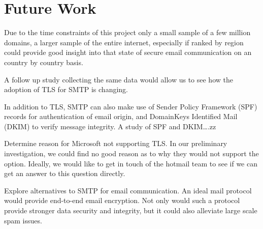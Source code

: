 \section{Future Work}
Due to the time constraints of this project only a small sample of a few million domains, a larger sample of the entire internet, especially if ranked by region could provide good insight into that state of secure email communication on an country by country basis.

A follow up study collecting the same data would allow us to see how the adoption of TLS for SMTP is changing.

In addition to TLS, SMTP can also make use of Sender Policy Framework (SPF) records for authentication of email origin, and DomainKeys Identified Mail (DKIM) to verify message integrity. A study of SPF and DKIM….zz

Determine reason for Microsoft not supporting TLS. In our preliminary investigation, we could find no good reason as to why they would not support the option. Ideally, we would like to get in touch of the hotmail team to see if we can get an answer to this question directly.

Explore alternatives to SMTP for email communication. An ideal mail protocol would provide end-to-end email encryption. Not only would such a protocol provide stronger data security and integrity, but it could also alleviate large scale spam issues. 
